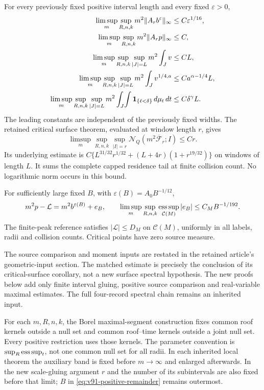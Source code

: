 \begin{inputstatement}
\label{input:v91-local}
For every previously fixed positive interval length and every fixed
$\varepsilon>0$,
\begin{align}
 \limsup_m\sup_{R,n,k}m^2\|A_r b^\varepsilon\|_\infty
                                      &\le C\varepsilon^{1/16},\notag\\
 \limsup_m\sup_{R,n,k}m^2\|A_rp\|_\infty&\le C,\notag\\
 \limsup_m\sup_{R,n,k}\sup_{|J|=L}m^2\int_Jv
                                      &\le CL,\notag\\
 \limsup_m\sup_{R,n,k}\sup_{|J|=L}m^2\int_Jv^{1/4,a}
                                      &\le Ca^{\alpha-1/4}L,\notag\\
 \limsup_m\sup_{R,n,k}\sup_{|J|=L}m^2
   \int_J\!\int\one_{\{\ell<\delta\}}\,d\mu_t\,dt
                                      &\le C\delta^\gamma L.
 \label{eq:v91-local-input}
\end{align}
The leading constants are independent of the previously fixed widths.
The retained critical surface theorem, evaluated at window length
$r$, gives
\begin{equation}\label{eq:v91-matched-input}
 \limsup_m\sup_{R,n,k}\sup_{|I|=r}
       \mathcal N_Q(m^2\overline{\mathcal F}_r;I)\le Cr.
\end{equation}
Its underlying estimate is
$C\{L^{31/32}r^{1/32}+(L+4r)(1+r^{19/32})\}$ on windows
of length $L$. It sums the complete capped residence tail at finite
collision count. No logarithmic norm occurs in this bound.

For sufficiently large fixed $B$, with $\varepsilon(B)=A_0B^{-1/12}$,
\begin{equation}\label{eq:v91-positive-remainder}
 m^2p-\mathcal L=m^2b^{\varepsilon(B)}+e_B,
 \qquad\limsup_m\sup_{R,n,k}\esssup_{\mathcal C(M)}|e_B|
                                        \le C_MB^{-1/192}.
\end{equation}
The finite-peak reference satisfies
$|\mathcal L|\le D_M$ on $\mathcal C(M)$, uniformly in all labels,
radii and collision counts. Critical points have zero source measure.
\end{inputstatement}
The source comparison and moment inputs are restated in the retained
article's geometric-input section. The matched estimate is precisely
the conclusion of its critical-surface corollary, not a new surface
spectral hypothesis. The new proofs below add only finite interval
gluing, positive source comparison and real-variable maximal estimates.
The full four-record spectral chain remains an inherited input.

For each $m,R,n,k$, the Borel maximal-segment construction fixes common
roof kernels outside a null set and common roof--time kernels outside
a joint null set. Every positive restriction uses those kernels.
The parameter convention is $\sup_R\operatorname*{ess\,sup}_t$, not one common null
set for all radii. In each inherited local theorem the auxiliary
band is fixed before $m\to\infty$ and enlarged afterwards. In the
new scale-gluing argument $r$ and the number of its subintervals are
also fixed before that limit; $B$ in
\eqref{eq:v91-positive-remainder} remains outermost.
